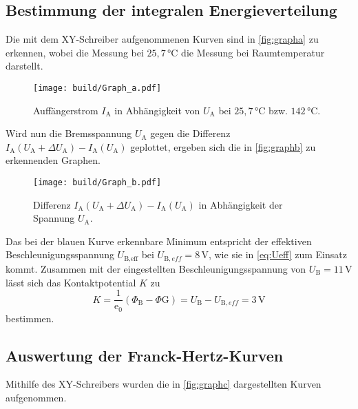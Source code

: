 \subsection{Bestimmung der integralen Energieverteilung}

Die mit dem XY-Schreiber aufgenommenen Kurven sind in \autoref{fig:grapha} zu erkennen, wobei die Messung bei $25,7 \,\unit{\celsius}$ die Messung bei Raumtemperatur darstellt.

\begin{figure}[H]
    \centering
    \texttt{[image: build/Graph\_a.pdf]}
    \caption{Auffängerstrom $I_\text{A}$ in Abhängigkeit von $U_\text{A}$ bei $25,7 \,\unit{\celsius}$ bzw. $142 \,\unit{\celsius}$.}
    \label{fig:grapha}
\end{figure}

Wird nun die Bremsspannung $U_\text{A}$ gegen die Differenz $I_\text{A}(U_\text{A}+ \Delta U_\text{A}) - I_\text{A}(U_\text{A})$ geplottet, ergeben sich die in \autoref{fig:graphb} zu erkennenden Graphen.

\begin{figure}
    \centering
    \texttt{[image: build/Graph\_b.pdf]}
    \caption{Differenz $I_\text{A}(U_\text{A}+ \Delta U_\text{A}) - I_\text{A}(U_\text{A})$ in Abhängigkeit der Spannung $U_\text{A}$.}
    \label{fig:graphb}
\end{figure}

Das bei der blauen Kurve erkennbare Minimum entspricht der effektiven Beschleunigungsspannung $U_{\text{B},\text{eff}}$ bei $U_{\text{B},eff} = 8 \,\unit{\volt}$, wie sie in \eqref{eq:Ueff} zum Einsatz kommt.
Zusammen mit der eingestellten Beschleunigungsspannung von $U_\text{B} = 11 \,\unit{\volt}$ lässt sich das Kontaktpotential $K$ zu
\begin{equation*}
    K = \frac{1}{\text{e}_0} (\Phi_\text{B} - \Phi\text{G}) = U_\text{B} - U_{\text{B},eff} = 3 \,\unit{\volt} %
\end{equation*}
bestimmen.


\subsection{Auswertung der Franck-Hertz-Kurven}

Mithilfe des XY-Schreibers wurden die in \autoref{fig:graphc} dargestellten Kurven aufgenommen.


